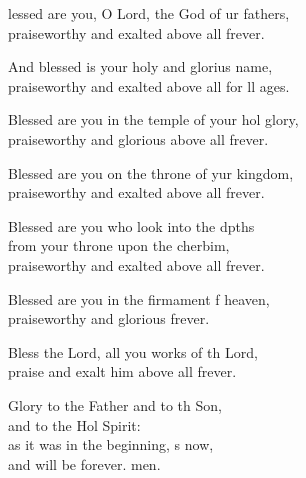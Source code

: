 \settowidth{\versewidth}{Blessed are you in the temple of your holy glory, *}
\begin{psalmverse}%
  \begin{patverse}
lessed are you, O Lord, the God of ur fathers,\Med\\
praiseworthy and exalted above all frever.

And blessed is your holy and glorius name,\Med\\
praiseworthy and exalted above all for ll ages.

Blessed are you in the temple of your hol glory,\Med\\
praiseworthy and glorious above all frever.

Blessed are you on the throne of yur kingdom,\Med\\
praiseworthy and exalted above all frever.

Blessed are you who look into the dpths\Flex\\
from your throne upon the cherbim,\Med\\
praiseworthy and exalted above all frever.

Blessed are you in the firmament f heaven,\Med\\
praiseworthy and glorious frever.

Bless the Lord, all you works of th Lord,\Med\\
praise and exalt him above all frever.

Glory to the Father and to th Son,\Med\\
and to the Hol Spirit:\\
as it was in the beginning, \pointup{\i}s now,\Med\\
and will be forever. men. 
  \end{patverse}
\end{psalmverse}
